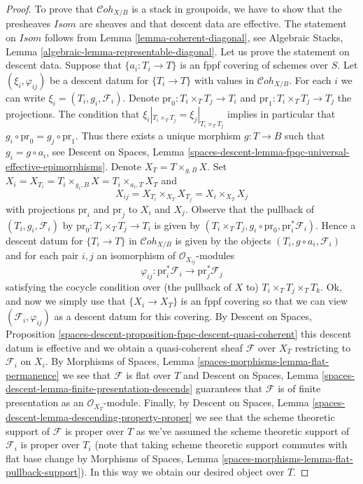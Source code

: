 \documentclass{stacks-project}
\theoremstyle{plain}
\theoremstyle{definition}
\theoremstyle{remark}
\numberwithin{equation}{subsection}
\def\Cohstack{\mathcal{C}\!\mathit{oh}}
\begin{document}
\begin{proof}
To prove that $\Cohstack_{X/B}$ is a stack in groupoids, we have to show
that the presheaves $\mathit{Isom}$ are sheaves and that descent data are
effective. The statement on $\mathit{Isom}$ follows from
Lemma \ref{lemma-coherent-diagonal}, see
Algebraic Stacks, Lemma \ref{algebraic-lemma-representable-diagonal}.
Let us prove the statement on descent data.
Suppose that $\{a_i : T_i \to T\}$ is an fppf covering of schemes over $S$.
Let $(\xi_i, \varphi_{ij})$ be a descent datum for $\{T_i \to T\}$
with values in $\Cohstack_{X/B}$.
For each $i$ we can write $\xi_i = (T_i, g_i, \mathcal{F}_i)$.
Denote $\text{pr}_0 : T_i \times_T T_j \to T_i$ and
$\text{pr}_1 : T_i \times_T T_j \to T_j$ the projections.
The condition that $\xi_i|_{T_i \times_T T_j} = \xi_j|_{T_i \times_T T_j}$
implies in particular that $g_i \circ \text{pr}_0 = g_j \circ \text{pr}_1$.
Thus there exists a unique morphism $g : T \to B$ such that
$g_i = g \circ a_i$, see
Descent on Spaces, Lemma
\ref{spaces-descent-lemma-fpqc-universal-effective-epimorphisms}.
Denote $X_T = T \times_{g, B} X$. Set
$X_i = X_{T_i} = T_i \times_{g_i, B} X = T_i \times_{a_i, T} X_T$
and
$$
X_{ij} = X_{T_i} \times_{X_T} X_{T_j} = X_i \times_{X_T} X_j
$$
with projections $\text{pr}_i$ and $\text{pr}_j$ to $X_i$ and $X_j$.
Observe that the pullback of $(T_i, g_i, \mathcal{F}_i)$
by $\text{pr}_0 : T_i \times_T T_j \to T_i$ is given by
$(T_i \times_T T_j, g_i \circ \text{pr}_0, \text{pr}_i^*\mathcal{F}_i)$.
Hence a descent datum for $\{T_i \to T\}$ in $\Cohstack_{X/B}$
is given by the objects $(T_i, g \circ a_i, \mathcal{F}_i)$
and for each pair $i, j$ an isomorphism of $\mathcal{O}_{X_{ij}}$-modules
$$
\varphi_{ij} :
\text{pr}_i^*\mathcal{F}_i \longrightarrow \text{pr}_j^*\mathcal{F}_j
$$
satisfying the cocycle condition over (the pullback of $X$ to)
$T_i \times_T T_j \times_T T_k$.
Ok, and now we simply use that $\{X_i \to X_T\}$ is an fppf covering
so that we can view $(\mathcal{F}_i, \varphi_{ij})$ as a descent datum
for this covering. By
Descent on Spaces, Proposition
\ref{spaces-descent-proposition-fpqc-descent-quasi-coherent}
this descent datum is effective and we obtain a quasi-coherent
sheaf $\mathcal{F}$ over $X_T$ restricting to $\mathcal{F}_i$ on $X_i$.
By Morphisms of Spaces, Lemma \ref{spaces-morphisms-lemma-flat-permanence}
we see that $\mathcal{F}$ is flat over $T$ and
Descent on Spaces, Lemma
\ref{spaces-descent-lemma-finite-presentation-descends}
guarantees that $\mathcal{F}$ is of finite presentation as an
$\mathcal{O}_{X_T}$-module. Finally, by
Descent on Spaces, Lemma \ref{spaces-descent-lemma-descending-property-proper}
we see that the scheme theoretic support of $\mathcal{F}$ is proper over
$T$ as we've assumed the scheme theoretic support of $\mathcal{F}_i$
is proper over $T_i$ (note that taking scheme theoretic support commutes
with flat base change by
Morphisms of Spaces, Lemma \ref{spaces-morphisms-lemma-flat-pullback-support}).
In this way we obtain our desired object over $T$.
\end{proof}
\end{document}
